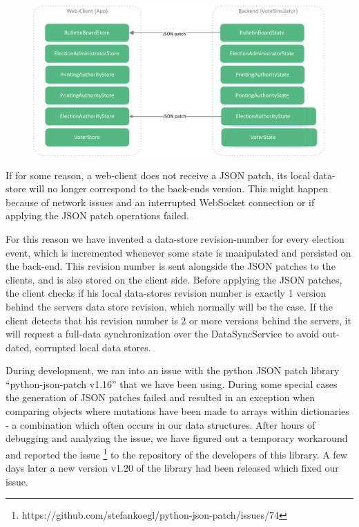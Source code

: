 \begin{figure}
\begin{center}
\includegraphics[scale=0.62]{assets/DatastoresJsonPatch.pdf}
\label{Data-Sync with JSON Patches}%
\end{center}
\end{figure}

If for some reason, a web-client does not receive a JSON patch, its local data-store will no longer correspond to the back-ends version. This might happen because of network issues and an interrupted WebSocket connection or if applying the JSON patch operations failed.

For this reason we have invented a data-store revision-number for every election event, which is incremented whenever some state is manipulated and persisted on the back-end. This revision number is sent alongside the JSON patches to the clients, and is also stored on the client side. Before applying the JSON patches, the client checks if his local data-stores revision number is exactly 1 version behind the servers data store revision, which normally will be the case. If the client detects that his revision number is 2 or more versions behind the servers, it will request a full-data synchronization over the DataSyncService to avoid out-dated, corrupted local data stores.

During development, we ran into an issue with the python JSON patch library "`python-json-patch v1.16"' that we have been using. During some special cases the generation of JSON patches failed and resulted in an exception when comparing objects where mutations have been made to arrays within dictionaries - a combination which often occurs in our data structures. After hours of debugging and analyzing the issue, we have figured out a temporary workaround and reported the issue \footnote{https://github.com/stefankoegl/python-json-patch/issues/74} to the repository of the developers of this library. A few days later a new version v1.20 of the library had been released which fixed our issue.

